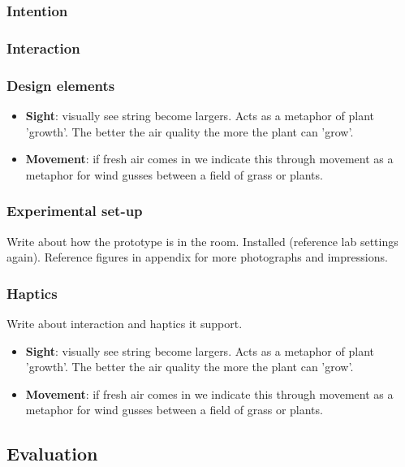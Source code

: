 \subsubsection{Intention}

\subsubsection{Interaction}

\subsubsection{Design elements}

\begin{itemize}
  \item \textbf{Sight}: visually see string become largers. Acts as a metaphor of plant 'growth'. The better the air quality the more the plant can 'grow'.
  \item \textbf{Movement}: if fresh air comes in we indicate this through movement as a metaphor for wind gusses between a field of grass or plants.
\end{itemize}

\subsubsection{Experimental set-up}

Write about how the prototype is in the room. Installed (reference lab settings again). Reference figures in appendix for more photographs and impressions.

\subsubsection{Haptics}

Write about interaction and haptics it support.

\begin{itemize}
  \item \textbf{Sight}: visually see string become largers. Acts as a metaphor of plant 'growth'. The better the air quality the more the plant can 'grow'.
  \item \textbf{Movement}: if fresh air comes in we indicate this through movement as a metaphor for wind gusses between a field of grass or plants.
\end{itemize}

\subsection{Evaluation}

